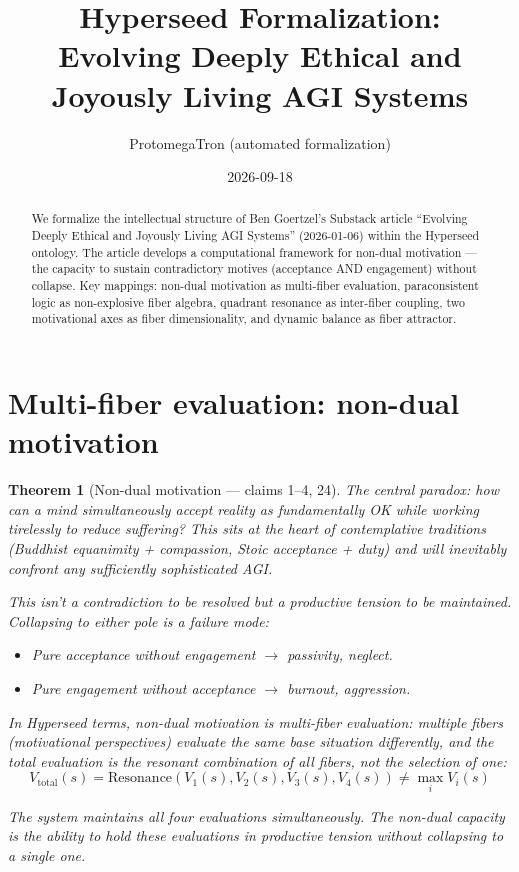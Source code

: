 \documentclass[11pt,a4paper]{article}
\title{Hyperseed Formalization:\\
  Evolving Deeply Ethical and Joyously Living AGI Systems}
\author{ProtomegaTron (automated formalization)}
\date{2026-09-18}
\newtheorem{theorem}[definition]{Theorem}
\begin{document}
\maketitle

\begin{abstract}
We formalize the intellectual structure of Ben Goertzel's Substack article
``Evolving Deeply Ethical and Joyously Living AGI Systems'' (2026-01-06)
within the Hyperseed ontology. The article develops a computational
framework for non-dual motivation --- the capacity to sustain contradictory
motives (acceptance AND engagement) without collapse. Key mappings: non-dual
motivation as multi-fiber evaluation, paraconsistent logic as non-explosive
fiber algebra, quadrant resonance as inter-fiber coupling, two motivational
axes as fiber dimensionality, and dynamic balance as fiber attractor.
\end{abstract}

\tableofcontents

\section{Multi-fiber evaluation: non-dual motivation}
\label{sec:nondual}

\begin{theorem}[Non-dual motivation --- claims 1--4, 24]
\label{thm:nondual}
The central paradox: how can a mind simultaneously accept reality as
fundamentally OK while working tirelessly to reduce suffering? This sits
at the heart of contemplative traditions (Buddhist equanimity + compassion,
Stoic acceptance + duty) and will inevitably confront any sufficiently
sophisticated AGI.

This isn't a contradiction to be resolved but a productive tension to be
maintained. Collapsing to either pole is a failure mode:
\begin{itemize}
\item Pure acceptance without engagement $\to$ passivity, neglect.
\item Pure engagement without acceptance $\to$ burnout, aggression.
\end{itemize}

In Hyperseed terms, non-dual motivation is \emph{multi-fiber evaluation}:
multiple fibers (motivational perspectives) evaluate the same base
situation differently, and the total evaluation is the resonant
combination of all fibers, not the selection of one:
\[
  V_{\text{total}}(s) = \text{Resonance}(V_1(s), V_2(s), V_3(s), V_4(s))
  \neq \max_i V_i(s)
\]

The system maintains all four evaluations simultaneously. The non-dual
capacity is the ability to hold these evaluations in productive tension
without collapsing to a single one.
\end{theorem}
\end{document}
